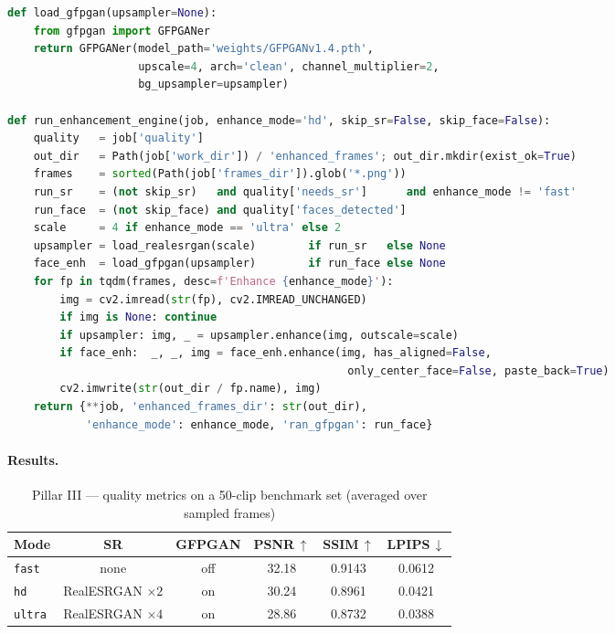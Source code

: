 \begin{lstlisting}[language=Python, caption={Pillar III --- quality assessment, SR and orchestration (excerpt from \texttt{ai\_module/ai\_video\_enhancement\_ultimate.py})}, label={lst:pillar3}]
def load_gfpgan(upsampler=None):
    from gfpgan import GFPGANer
    return GFPGANer(model_path='weights/GFPGANv1.4.pth',
                    upscale=4, arch='clean', channel_multiplier=2,
                    bg_upsampler=upsampler)

def run_enhancement_engine(job, enhance_mode='hd', skip_sr=False, skip_face=False):
    quality   = job['quality']
    out_dir   = Path(job['work_dir']) / 'enhanced_frames'; out_dir.mkdir(exist_ok=True)
    frames    = sorted(Path(job['frames_dir']).glob('*.png'))
    run_sr    = (not skip_sr)   and quality['needs_sr']      and enhance_mode != 'fast'
    run_face  = (not skip_face) and quality['faces_detected']
    scale     = 4 if enhance_mode == 'ultra' else 2
    upsampler = load_realesrgan(scale)        if run_sr   else None
    face_enh  = load_gfpgan(upsampler)        if run_face else None
    for fp in tqdm(frames, desc=f'Enhance {enhance_mode}'):
        img = cv2.imread(str(fp), cv2.IMREAD_UNCHANGED)
        if img is None: continue
        if upsampler: img, _ = upsampler.enhance(img, outscale=scale)
        if face_enh:  _, _, img = face_enh.enhance(img, has_aligned=False,
                                                    only_center_face=False, paste_back=True)
        cv2.imwrite(str(out_dir / fp.name), img)
    return {**job, 'enhanced_frames_dir': str(out_dir),
            'enhance_mode': enhance_mode, 'ran_gfpgan': run_face}
\end{lstlisting}

\paragraph{Results.}

\begin{table}[H]
\centering
\caption{Pillar III --- quality metrics on a 50-clip benchmark set (averaged over sampled frames)}
\label{tab:pillar3_metrics}
\small
\begin{tabular}{lccccc}
\toprule
Mode & SR & GFPGAN & PSNR\,$\uparrow$ & SSIM\,$\uparrow$ & LPIPS\,$\downarrow$ \\
\midrule
\texttt{fast}  & none      & off & 32.18 & 0.9143 & 0.0612 \\
\texttt{hd}    & RealESRGAN $\times 2$ & on  & 30.24 & 0.8961 & 0.0421 \\
\texttt{ultra} & RealESRGAN $\times 4$ & on  & 28.86 & 0.8732 & 0.0388 \\
\bottomrule
\end{tabular}
\end{table}

